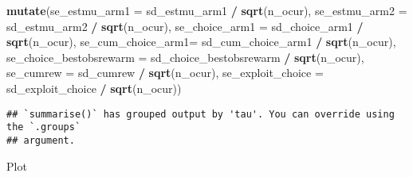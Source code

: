 \documentclass[
]{article}
\newenvironment{Shaded}{\begin{snugshade}}{\end{snugshade}}
\newcommand{\AttributeTok}[1]{\textcolor[rgb]{0.13,0.29,0.53}{#1}}
\newcommand{\FunctionTok}[1]{\textcolor[rgb]{0.13,0.29,0.53}{\textbf{#1}}}
\newcommand{\NormalTok}[1]{#1}
\newcommand{\SpecialCharTok}[1]{\textcolor[rgb]{0.81,0.36,0.00}{\textbf{#1}}}
\begin{document}
\begin{Shaded}
\begin{Highlighting}[]
  \FunctionTok{mutate}\NormalTok{(}\AttributeTok{se\_estmu\_arm1 =}\NormalTok{ sd\_estmu\_arm1 }\SpecialCharTok{/} \FunctionTok{sqrt}\NormalTok{(n\_ocur),}
         \AttributeTok{se\_estmu\_arm2 =}\NormalTok{ sd\_estmu\_arm2 }\SpecialCharTok{/} \FunctionTok{sqrt}\NormalTok{(n\_ocur),}
         \AttributeTok{se\_choice\_arm1 =}\NormalTok{ sd\_choice\_arm1 }\SpecialCharTok{/} \FunctionTok{sqrt}\NormalTok{(n\_ocur),}
         \AttributeTok{se\_cum\_choice\_arm1=}\NormalTok{ sd\_cum\_choice\_arm1 }\SpecialCharTok{/} \FunctionTok{sqrt}\NormalTok{(n\_ocur),}
         \AttributeTok{se\_choice\_bestobsrewarm =}\NormalTok{ sd\_choice\_bestobsrewarm }\SpecialCharTok{/} \FunctionTok{sqrt}\NormalTok{(n\_ocur),}
         \AttributeTok{se\_cumrew =}\NormalTok{ sd\_cumrew }\SpecialCharTok{/} \FunctionTok{sqrt}\NormalTok{(n\_ocur),}
         \AttributeTok{se\_exploit\_choice =}\NormalTok{ sd\_exploit\_choice }\SpecialCharTok{/} \FunctionTok{sqrt}\NormalTok{(n\_ocur))}
\end{Highlighting}
\end{Shaded}

\begin{verbatim}
## `summarise()` has grouped output by 'tau'. You can override using the `.groups`
## argument.
\end{verbatim}

Plot
\end{document}
